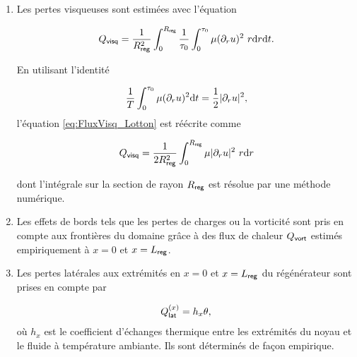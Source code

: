 \begin{enumerate}[label=\textbf{(\roman*)}]
%
%

\item Les pertes visqueuses sont estimées avec l'équation

\begin{equation}
Q_{\sf visq} = \frac{1}{R_{\sf reg}^2} \int_{0}^{R_{\sf reg}} \frac{1}{\tau_0} \int_0^{\tau_0} \mu (\partial_r u)^2\ r \mathrm{d} r \mathrm{d} t.
\label{eq:FluxVisq_Lotton}
\end{equation}

En utilisant l'identité

\begin{equation*}
\frac{1}{T}\int_{0}^{\tau_0}\mu(\partial_r u)^2\mathrm{d} t = \frac12|\partial_r u|^2,
\end{equation*}
l'équation \eqref{eq:FluxVisq_Lotton} est réécrite comme

\begin{equation}
	Q_{\sf visq} = \frac{1}{2R_{\sf reg}^2} \int_{0}^{R_{\sf reg}} \mu |\partial_r u|^2\ r \mathrm{d} r
	\label{eq:FluxVisq_Lotton_IntegralTSimplifie}
\end{equation}

dont l'intégrale sur la section de rayon $R_{\sf reg}$ est résolue par une méthode numérique.

\item Les effets de bords tels que les pertes de charges ou la vorticité sont pris en compte aux frontières du domaine grâce à des flux de chaleur $Q_{\sf vort}$ estimés empiriquement à $x=0$ et $x=L_{\sf reg}$.

\item Les pertes latérales aux extrémités en $x=0$ et $x=L_{\sf reg}$ du régénérateur sont prises en compte par

\begin{equation}
	Q_{\sf lat}^{(x)} = h_x \theta,
	\label{eq:FluxLat_Lotton}
\end{equation}
où $h_x$ est le coefficient d'échanges thermique entre les extrémités du noyau et le fluide à température ambiante. Ils sont déterminés de façon empirique.


\end{enumerate}
